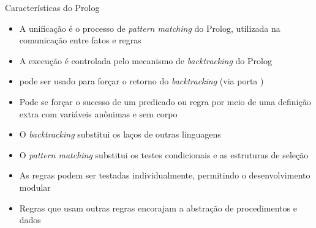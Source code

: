 \begin{frame}[fragile]{Características do Prolog}

    \begin{itemize}
        \item A unificação é o processo de \textit{pattern matching} do Prolog, utilizada na 
            comunicação entre fatos e regras

        \item A execução é controlada pelo mecanismo de \textit{backtracking} do Prolog

        \item {} pode ser usado para forçar o retorno do 
            \textit{backtracking} (via porta )

        \item Pode se forçar o sucesso de um predicado ou regra por meio de uma definição 
            extra com variáveis anônimas e sem corpo

        \item O \textit{backtracking} substitui os laços de outras linguagens

        \item O \textit{pattern matching} substitui os testes condicionais e as estruturas de 
            seleção

        \item As regras podem ser testadas individualmente, permitindo o desenvolvimento 
            modular

        \item Regras que usam outras regras encorajam a abstração de procedimentos e dados

    \end{itemize}

\end{frame}

